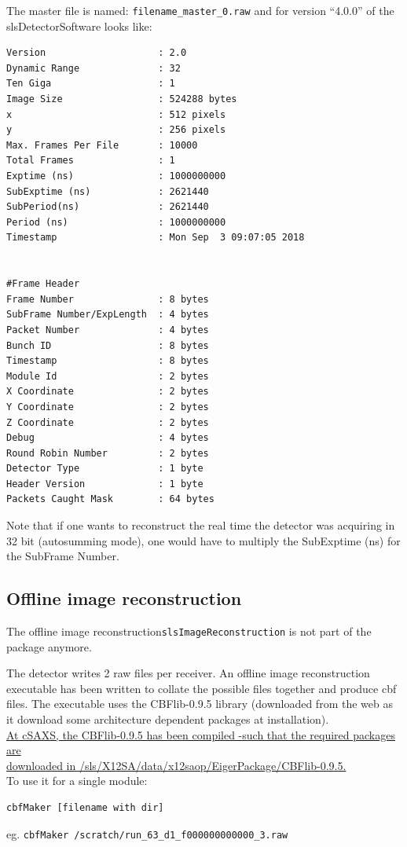 \documentclass{article}
\begin{document}
The master file is named: {\tt{filename\_master\_0.raw}} and for version ``4.0.0'' of the slsDetectorSoftware looks like:
 
\begin{verbatim}
Version                    : 2.0
Dynamic Range              : 32
Ten Giga                   : 1
Image Size                 : 524288 bytes
x                          : 512 pixels
y                          : 256 pixels
Max. Frames Per File       : 10000
Total Frames               : 1
Exptime (ns)               : 1000000000
SubExptime (ns)            : 2621440
SubPeriod(ns)              : 2621440
Period (ns)                : 1000000000
Timestamp                  : Mon Sep  3 09:07:05 2018


#Frame Header
Frame Number               : 8 bytes
SubFrame Number/ExpLength  : 4 bytes
Packet Number              : 4 bytes
Bunch ID                   : 8 bytes
Timestamp                  : 8 bytes
Module Id                  : 2 bytes
X Coordinate               : 2 bytes
Y Coordinate               : 2 bytes
Z Coordinate               : 2 bytes
Debug                      : 4 bytes
Round Robin Number         : 2 bytes
Detector Type              : 1 byte
Header Version             : 1 byte
Packets Caught Mask        : 64 bytes
\end{verbatim}

Note that if one wants to  reconstruct the real time the detector was acquiring in 32 bit (autosumming mode), one would have to multiply the SubExptime (ns) for the SubFrame Number. 

\subsection{Offline image reconstruction}
The offline image reconstruction{\tt{slsImageReconstruction}} is not part of the package anymore.

The detector writes 2 raw files per receiver. An offline image reconstruction executable has been written to collate the possible files together and produce cbf files. The executable uses the CBFlib-0.9.5 library (downloaded from the web as it download some architecture dependent packages at installation).\\
\underline{At cSAXS, the CBFlib-0.9.5 has been compiled -such that the required packages are}\\\underline{ downloaded in /sls/X12SA/data/x12saop/EigerPackage/CBFlib-0.9.5.}\\ 

To use it for a single module:
\begin{verbatim}
cbfMaker [filename with dir]
\end{verbatim}
eg.
{\tt{cbfMaker /scratch/run\_63\_d1\_f000000000000\_3.raw}}\\
\end{document}
